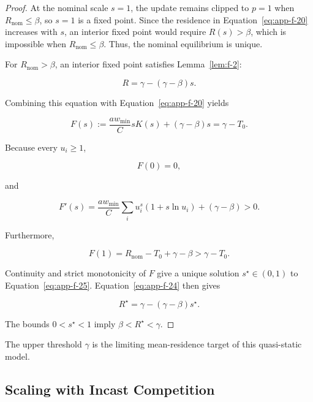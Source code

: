\begin{proof} At the nominal scale \(s=1\), the update remains clipped to \(p=1\) when \(R_{\mathrm{nom}}\le\beta\), so \(s=1\) is a fixed point. Since the residence in Equation~\eqref{eq:app-f-20} increases with \(s\), an interior fixed point would require \(R(s)>\beta\), which is impossible when \(R_{\mathrm{nom}}\le\beta\). Thus, the nominal equilibrium is unique.

For \(R_{\mathrm{nom}}>\beta\), an interior fixed point satisfies Lemma~\ref{lem:f-2}: 

\begin{equation}
\label{eq:app-f-24}
R=\gamma-(\gamma-\beta)s.
\end{equation}

Combining this equation with Equation~\eqref{eq:app-f-20} yields

\begin{equation}
\label{eq:app-f-25}
F(s):=
\frac{aw_{\min}}{C}sK(s)
+(\gamma-\beta)s
=\gamma-T_0.
\end{equation}

Because every \(u_i\ge1\),

\[
F(0)=0,
\]

and

\begin{equation}
\label{eq:app-f-26}
F'(s)
=
\frac{aw_{\min}}{C}
\sum_i u_i^s(1+s\ln u_i)
+(\gamma-\beta)>0.
\end{equation}

Furthermore,

\begin{equation}
\label{eq:app-f-27}
F(1)
=R_{\mathrm{nom}}-T_0+\gamma-\beta
>\gamma-T_0.
\end{equation}

Continuity and strict monotonicity of \(F\) give a unique solution \(s^\star\in(0,1)\) to Equation~\eqref{eq:app-f-25}. Equation~\eqref{eq:app-f-24} then gives

\[
R^\star
=\gamma-(\gamma-\beta)s^\star.
\]

The bounds \(0<s^\star<1\) imply \(\beta<R^\star<\gamma\).
\end{proof}

The upper threshold \(\gamma\) is the limiting mean-residence target of this quasi-static model.

\subsection{Scaling with Incast Competition}
\label{app:f-4}

